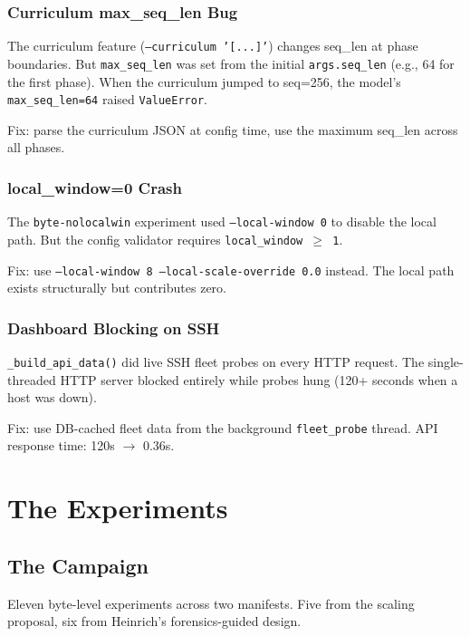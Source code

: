 \documentclass[11pt,a4paper]{report}
\begin{document}
\section{Curriculum max\_seq\_len Bug}

The curriculum feature (\texttt{--curriculum '[...]'}) changes seq\_len at phase boundaries. But \texttt{max\_seq\_len} was set from the initial \texttt{args.seq\_len} (e.g., 64 for the first phase). When the curriculum jumped to seq=256, the model's \texttt{max\_seq\_len=64} raised \texttt{ValueError}.

Fix: parse the curriculum JSON at config time, use the maximum seq\_len across all phases.

\section{local\_window=0 Crash}

The \texttt{byte-nolocalwin} experiment used \texttt{--local-window 0} to disable the local path. But the config validator requires \texttt{local\_window $\geq$ 1}.

Fix: use \texttt{--local-window 8 --local-scale-override 0.0} instead. The local path exists structurally but contributes zero.

\section{Dashboard Blocking on SSH}

\texttt{\_build\_api\_data()} did live SSH fleet probes on every HTTP request. The single-threaded HTTP server blocked entirely while probes hung (120+ seconds when a host was down).

Fix: use DB-cached fleet data from the background \texttt{fleet\_probe} thread. API response time: 120s $\to$ 0.36s.


\part{The Experiments}

\chapter{The Campaign}

Eleven byte-level experiments across two manifests. Five from the scaling proposal, six from Heinrich's forensics-guided design.
\end{document}
